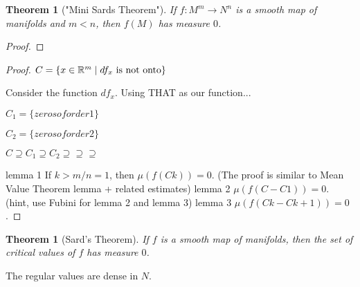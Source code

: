 \documentclass[11pt,leqno,oneside]{amsart}
\theoremstyle{mystyle} \newtheorem{thrm}[thm]{Theorem}
\theoremstyle{mystyle} \newtheorem{defi}[thm]{Definition}
\begin{document}
\begin{thrm}["Mini Sards Theorem"]
	If $f : M^m \to N^n$ is a smooth map of manifolds and $m < n$, then $f(M)$ has measure $0$.
\end{thrm}
\begin{proof}














\end{proof}
\begin{proof}
	$C = \{ x \in {\mathbb R}^m \mid df_x \text{ is not onto} \}$

	Consider the function $df_x$.  Using THAT as our function...

	$C_1 = \{zeros of order 1\}$

	$C_2 = \{zeros of order 2\}$

	$C \supseteq C_1 \supseteq C_2 \supseteq \supseteq \supseteq$

	lemma 1
		If $k > m/n = 1$, then $\mu(f(Ck)) = 0$.
		(The proof is similar to Mean Value Theorem lemma + related estimates)
	lemma 2
		$\mu(f(C-C1)) = 0$.
		(hint, use Fubini for lemma 2 and lemma 3)
	lemma 3
		$\mu(f(Ck-C{k+1})) = 0$.
\end{proof}
\begin{thrm}[Sard's Theorem]
	If $f$ is a smooth map of manifolds, then the set of critical values of $f$ has measure $0$.
\end{thrm}
\begin{cor}
	The regular values are dense in $N$.
\end{cor}
\end{document}
